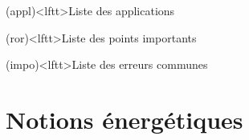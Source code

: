 \documentclass[../../main/main.tex]{subfiles}
\begin{document}
\begin{boxes}
	\begin{tcb}(appl)<lftt>{Liste des applications}
	\end{tcb}
	\begin{tcb}(ror)<lftt>{Liste des points importants}
	\end{tcb}
	\begin{tcb}(impo)<lftt>{Liste des erreurs communes}
	\end{tcb}
\end{boxes}
\vspace*{\fill}

\newpage

\section{Notions énergétiques}
\end{document}
